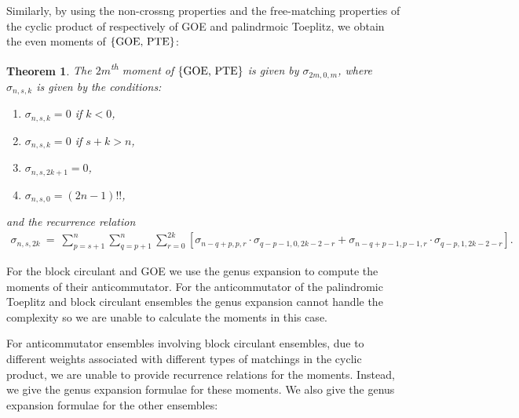 \documentclass[11pt,reqno]{amsart}
\numberwithin{equation}{section}
\theoremstyle{plain}
\newtheorem{theorem}[thm]{Theorem}
\begin{document}
Similarly, by using the non-crossng properties and the free-matching properties of the cyclic product of respectively of GOE and palindrmoic Toeplitz, we obtain the even moments of $\{\textup{GOE, PTE}\}$:

\begin{theorem}\label{sigmarecurrence intro}
The $2m$\textsuperscript{th} moment of $\{\textup{GOE, PTE}\}$ is given by $\sigma_{2m, 0, m}$, where $\sigma_{n, s, k}$ is given by the conditions:
\begin{enumerate}
\item $\sigma_{n, s, k}=0$ if $k<0$,
\item $\sigma_{n, s, k}=0$ if $s+k>n$,
\item $\sigma_{n, s, 2k+1}=0$,
\item $\sigma_{n, s, 0}=(2n-1)!!$,
\end{enumerate}
and the recurrence relation
\begin{align}
\sigma_{n, s, 2k} \ = \ \sum_{p=s+1}^n \sum_{q=p+1}^n \sum_{r=0}^{2k}\left[
\sigma_{n-q+p, p, r}\cdot\sigma_{q-p-1, 0, 2k-2-r}+\sigma_{n-q+p-1, p-1, r}\cdot\sigma_{q- p, 1, 2k-2-r}
\right].
\end{align}
\end{theorem}

For the block circulant and GOE we use the genus expansion to compute the moments of their anticommutator. For the anticommutator of the palindromic Toeplitz and block circulant ensembles the genus expansion cannot handle the complexity so we are unable to calculate the moments in this case.

For anticommutator ensembles involving block circulant ensembles, due to different weights associated with different types of matchings in the cyclic product, we are unable to provide recurrence relations for the moments. Instead, we give the genus expansion formulae for these moments. We also give the genus expansion formulae for the other ensembles:
\end{document}
